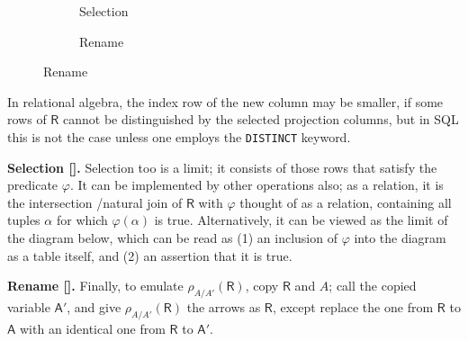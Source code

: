 \documentclass{article}
\theoremstyle{definition}
\theoremstyle{remark}
\newcommand{\var}[1]{\mathsf{#1}}
\begin{document}
\begin{figure}
\begin{subfigure}{0.29\textwidth}
\caption{Selection}\label{fig:selection}
	\end{subfigure}
	\hfill\vline\hfill
\begin{subfigure}{0.3\textwidth}
\caption{Rename}\label{fig:rename}
\end{subfigure}
\end{figure}
In relational algebra, the index row of the new column may be smaller, if some rows of $\var R$ cannot be distinguished by the selected projection columns, but in SQL this is not the case unless one employs the \texttt{DISTINCT} keyword.

\textbf{Selection [].}
Selection too is a limit; it consists of those rows that satisfy the predicate $\varphi$. 
It can be implemented by other operations also; as a relation, it is the intersection /natural join of $\var R$ with $\varphi$ thought of as a relation, containing all tuples $\alpha$ for which $\varphi(\alpha)$ is true. Alternatively, it can be viewed as the limit of the diagram below, which can be read as (1) an inclusion of $\varphi$ into the diagram as a table itself, and (2) an assertion that it is true.

\textbf{Rename [].}
Finally, to emulate $\rho_{A/A'}(\var R)$, copy $\var R$ and $A$; call the copied variable $\var A'$, and give $\rho_{A/A'}(\var R)$ the arrows as $\var R$, except replace the one from $\var R$ to $\var A$ with an identical one from $\var R$ to $\var A'$. 
\end{document}
